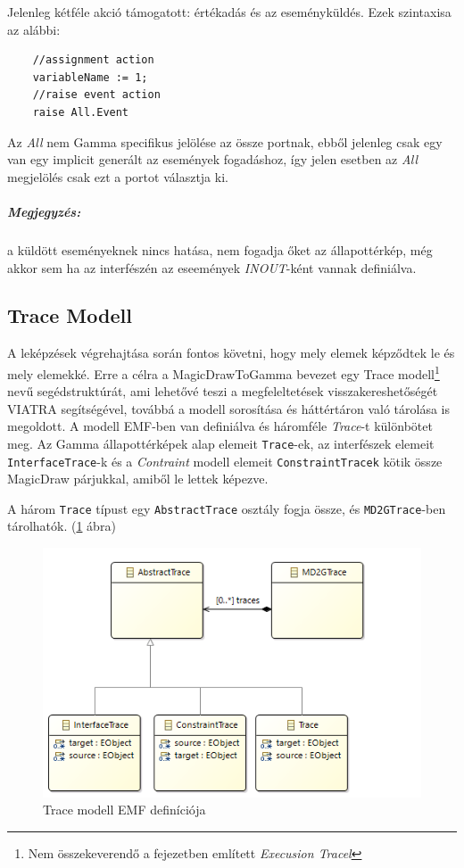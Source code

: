 Jelenleg kétféle akció támogatott: értékadás és az eseményküldés. Ezek szintaxisa az alábbi:

\begin{lstlisting}
	//assignment action
	variableName := 1;
	//raise event action
	raise All.Event
\end{lstlisting}

Az \emph{All} nem Gamma specifikus jelölése az össze portnak, ebből jelenleg csak egy van egy implicit generált az események fogadáshoz, így jelen esetben az \emph{All} megjelölés csak ezt a portot választja ki.

\subparagraph{Megjegyzés:} a küldött eseményeknek nincs hatása, nem fogadja őket az állapottérkép, még akkor sem ha az interfészén az eseemények \emph{INOUT}-ként vannak definiálva.

\subsection{Trace Modell}
\label{sec:trace_model}
A leképzések végrehajtása során fontos követni, hogy mely elemek képződtek le és mely elemekké. Erre a célra a MagicDrawToGamma bevezet egy Trace modell\footnote{Nem összekeverendő a  fejezetben említett \emph{Execusion Tracel}} nevű segédstruktúrát, ami lehetővé teszi a megfeleltetések visszakereshetőségét VIATRA segítségével, továbbá a modell sorosítása és háttértáron való tárolása is megoldott. A modell EMF-ben van definiálva és  háromféle \emph{Trace}-t különbötet meg. Az Gamma állapottérképek alap elemeit \verb+Trace+-ek, az interfészek elemeit \verb+InterfaceTrace+-k és a \emph{Contraint} modell elemeit \verb+ConstraintTracek+ kötik össze MagicDraw párjukkal, amiből le lettek képezve.

A három \verb+Trace+ típust egy \verb+AbstractTrace+ osztály fogja össze, és \verb+MD2GTrace+-ben tárolhatók. (\ref{fig:trace-model} ábra)

\begin{figure}[ht]
	\centering
	\includegraphics[keepaspectratio, width=140mm]{figures/trace-model.png}
	\caption{Trace modell EMF definíciója}
	\label{fig:trace-model}
\end{figure}


